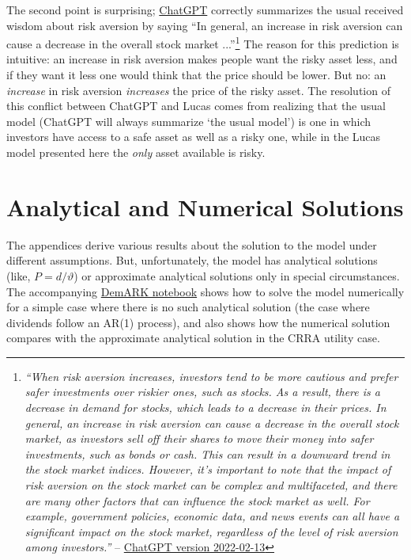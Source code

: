 \documentclass{\handout}
\begin{document}
The second point is surprising; \href{https://chat.openai.com/chat}{ChatGPT} correctly summarizes the usual received wisdom about risk aversion by saying ``In general, an increase in risk aversion can cause a decrease in the overall stock market ...''\footnote{\textit{``When risk aversion increases, investors tend to be more cautious and prefer safer investments over riskier ones, such as stocks. As a result, there is a decrease in demand for stocks, which leads to a decrease in their prices.  In general, an increase in risk aversion can cause a decrease in the overall stock market, as investors sell off their shares to move their money into safer investments, such as bonds or cash. This can result in a downward trend in the stock market indices. However, it's important to note that the impact of risk aversion on the stock market can be complex and multifaceted, and there are many other factors that can influence the stock market as well. For example, government policies, economic data, and news events can all have a significant impact on the stock market, regardless of the level of risk aversion among investors.''} -- \href{https://help.openai.com/en/articles/6825453-chatgpt-release-notes}{ChatGPT version 2022-02-13}}  The reason for this prediction is intuitive: an increase in risk aversion makes people want the risky asset less, and if they want it less one would think that the price should be lower.  But no: an \textit{increase} in risk aversion \textit{increases} the price of the risky asset.   The resolution of this conflict between ChatGPT and Lucas comes from realizing that the usual model (ChatGPT will always summarize `the usual model') is one in which investors have access to a safe asset as well as a risky one, while in the Lucas model presented here the \textit{only} asset available is risky.  

\section{Analytical and Numerical Solutions}

The appendices derive various results about the solution to the model under
different assumptions.  But, unfortunately, the model has analytical solutions
(like, $P = d/\vartheta$) or approximate analytical solutions only in special circumstances.  The accompanying
\href{https://mybinder.org/v2/gh/econ-ark/DemARK/HEAD?filepath=notebooks/Lucas-Asset-Pricing-Model.ipynb}{DemARK notebook}
shows how to solve the model numerically for a simple case where there is no
such analytical solution (the case where dividends follow an AR(1) process), and also shows
how the numerical solution compares with the approximate analytical solution in the CRRA utility case.
\end{document}

